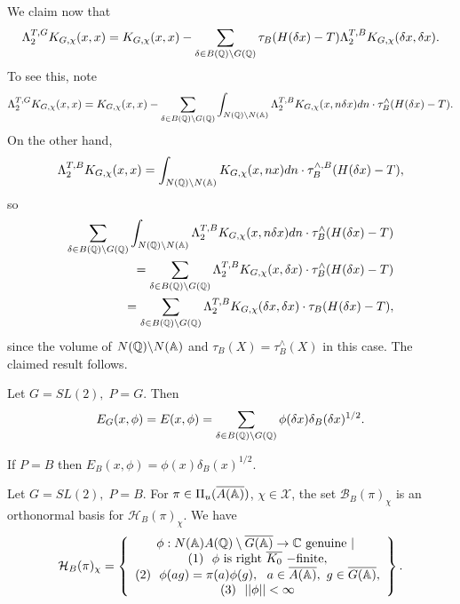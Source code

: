 \begin{example}
We claim now that 
\begin{equation}\label{eq:5.19}
\Lambda _2^{T,G}K_{G,\chi }(x,x)=K_{G,\chi }(x,x)-\sum_{\delta \in B(\qqq %
)\backslash G(\qqq )}\tau _B(H(\delta x)-T)\Lambda _2^{T,B}K_{G,\chi
}(\delta x,\delta x).
\end{equation}
To see this, note 
\[
\Lambda _2^{T,G}K_{G,\chi }(x,x)=K_{G,\chi }(x,x)-\sum_{\delta \in B(\qqq %
)\backslash G(\qqq )}\int_{N(\qqq )\backslash N(\aaa )}\Lambda
_2^{T,B}K_{G,\chi }(x,n\delta x)dn\cdot \tau _B^{\wedge }(H(\delta x)-T).
\]
On the other hand, 
\[
\Lambda _2^{T,B}K_{G,\chi }(x,x)=\int_{N(\qqq )\backslash N(\aaa %
)}K_{G,\chi }(x,nx)dn\cdot \tau _B^{\wedge ,B}(H(\delta x)-T),
\]
so 
\begin{eqnarray}
\sum_{\delta \in B(\mathbb{Q} )\backslash G(\mathbb{Q} )}\int_{N(\mathbb{Q} )\backslash
N(\mathbb{A} )}\Lambda _2^{T,B}K_{G,\chi }(x,n\delta x)dn\cdot \tau _B^{\wedge
}(H(\delta x)-T)  \nonumber \\
=\sum_{\delta \in B(\mathbb{Q} )\backslash G(\mathbb{Q} )}\Lambda _2^{T,B}K_{G,\chi
}(x,\delta x)\cdot \tau _B^{\wedge }(H(\delta x)-T)  \nonumber \\
=\sum_{\delta \in B(\mathbb{Q} )\backslash G(\mathbb{Q} )}\Lambda _2^{T,B}K_{G,\chi
}(\delta x,\delta x)\cdot \tau _B(H(\delta x)-T),
\label{eq:5.20}\end{eqnarray}
since the volume of $N(\mathbb{Q} )\backslash N(\mathbb{A} )$ and $\tau _B(X)=\tau
_B^{\wedge }(X)$ in this case. The claimed result follows.
\end{example}

\begin{example}\label{ex:5.17}
Let $G=SL(2),\;P=G$. Then 
\[
E_G(x,\phi )=E(x,\phi )=\sum_{\delta \in B(\qqq )\backslash G(\qqq %
)}\phi (\delta x)\delta _B(\delta x)^{1/2}.
\]

If $P=B$ then $E_B(x,\phi )=\phi (x)\delta _B(x)^{1/2}$.
\end{example}

\begin{example}\label{ex:5.18}
Let $G=SL(2),\;P=B$. For $\pi \in \Pi _u(\overline{A(\mathbb{A} )})$,
$\chi \in \mathcal{X}$,
the set ${\mathcal{B}}_B(\pi )_\chi $ is an orthonormal basis for
${\mathcal{H}}_B(\pi )_\chi $. We have 
\[
{\mathcal{H}}_B(\pi )_\chi =\left\{
\begin{array}{c}
\phi:N(\mathbb{A} )A(\mathbb{Q} )\setminus \overline{G(\mathbb{A} )}\rightarrow
{\mathbb C}\ {\rm genuine\ }|\ \\
(1)\ \  \phi {\rm\ is\  right}\  \overline{K_0}\ {\rm -finite},\\
(2) \ \ \phi(ag)=\pi(a)\phi(g),
\ \ a\in \overline{A(\mathbb{A} )},\ g\in \overline{G(\mathbb{A} )},\\
(3)\ \  ||\phi ||<\infty
\end{array}
\right\}.
\]
\end{example}

